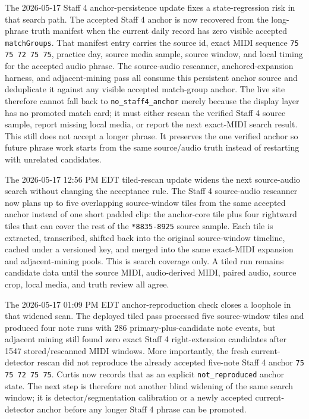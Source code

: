 \documentclass[12pt,letterpaper]{article}
\begin{document}
The 2026-05-17 Staff 4 anchor-persistence update fixes a state-regression risk in that search path. The accepted Staff 4 anchor is now recovered from the long-phrase truth manifest when the current daily record has zero visible accepted \texttt{matchGroups}. That manifest entry carries the source id, exact MIDI sequence \texttt{75 75 72 75 75}, practice day, source media sample, source window, and local timing for the accepted audio phrase. The source-audio rescanner, anchored-expansion harness, and adjacent-mining pass all consume this persistent anchor source and deduplicate it against any visible accepted match-group anchor. The live site therefore cannot fall back to \texttt{no\_staff4\_anchor} merely because the display layer has no promoted match card; it must either rescan the verified Staff 4 source sample, report missing local media, or report the next exact-MIDI search result. This still does not accept a longer phrase. It preserves the one verified anchor so future phrase work starts from the same source/audio truth instead of restarting with unrelated candidates.

The 2026-05-17 12:56 PM EDT tiled-rescan update widens the next source-audio search without changing the acceptance rule. The Staff 4 source-audio rescanner now plans up to five overlapping source-window tiles from the same accepted anchor instead of one short padded clip: the anchor-core tile plus four rightward tiles that can cover the rest of the \texttt{*8835-8925} source sample. Each tile is extracted, transcribed, shifted back into the original source-window timeline, cached under a versioned key, and merged into the same exact-MIDI expansion and adjacent-mining pools. This is search coverage only. A tiled run remains candidate data until the source MIDI, audio-derived MIDI, paired audio, source crop, local media, and truth review all agree.

The 2026-05-17 01:09 PM EDT anchor-reproduction check closes a loophole in that widened scan. The deployed tiled pass processed five source-window tiles and produced four note runs with 286 primary-plus-candidate note events, but adjacent mining still found zero exact Staff 4 right-extension candidates after 1547 stored/rescanned MIDI windows. More importantly, the fresh current-detector rescan did not reproduce the already accepted five-note Staff 4 anchor \texttt{75 75 72 75 75}. Curtis now records that as an explicit \texttt{not\_reproduced} anchor state. The next step is therefore not another blind widening of the same search window; it is detector/segmentation calibration or a newly accepted current-detector anchor before any longer Staff 4 phrase can be promoted.
\end{document}

